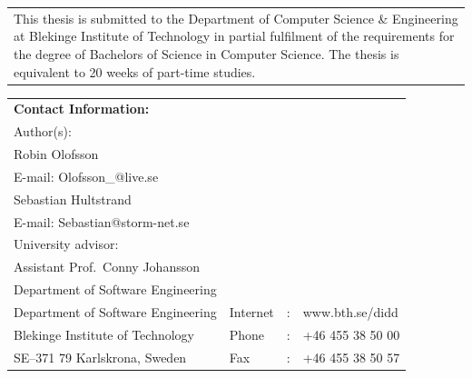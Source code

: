 \documentclass[a4paper,oneside]{bth} %
\begin{document}
		{\pagestyle{empty}
			\changepage{5cm}{1cm}{-0.5cm}{-0.5cm}{}{-2cm}{}{}{}
			\noindent%
			\begin{tabular}{p{\textwidth}}
				{\small This thesis is submitted to the Department of Computer Science \& Engineering at Blekinge Institute of Technology in partial fulfilment of the requirements for the degree of Bachelors of Science in Computer Science. The thesis is equivalent to 20 weeks of part-time studies.}
			\end{tabular}
			\par\vspace {12cm}
			\noindent%
			\begin{tabular}{p{}lcl}
				\textbf{Contact Information:}\\
				Author(s):
				\\
				Robin Olofsson
				\\
				E-mail: Olofsson\_@live.se
				\\
				Sebastian Hultstrand
				\\
				E-mail: Sebastian@storm-net.se
				\\
				\par\vspace {5cm}
				University advisor:
				\\
				Assistant Prof.\ Conny Johansson
				\\
				Department of Software Engineering 
				\par\vspace {1cm}
				\noindent%
 				\\
				Department of Software Engineering  & Internet & : & www.bth.se/didd\\
				Blekinge Institute of Technology & Phone	& : & +46 455 38 50 00 \\
				SE--371 79 Karlskrona, Sweden & Fax & : & +46 455 38 50 57 \\
			\end{tabular}
			\clearpage
		} %

		\setcounter{page}{1}
\end{document}
